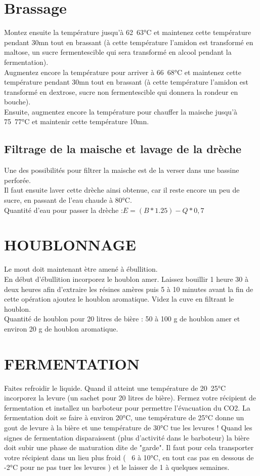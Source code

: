 \documentclass{report}
\begin{document}
\section{Brassage}
Montez ensuite la température jusqu'à 62~63°C et maintenez cette température pendant 30mn tout en brassant (à cette température l'amidon est transformé en maltose, un sucre fermentescible qui sera transformé en alcool pendant la fermentation).\\
Augmentez encore la température pour arriver à 66~68°C et maintenez cette température pendant 30mn tout en brassant (à cette température l'amidon est transformé en dextrose, sucre non fermentescible qui donnera la rondeur en bouche).\\
Ensuite, augmentez encore la température pour chauffer la maische jusqu'à 75~77°C et maintenir cette température 10mn.


\subsection*{ Filtrage de la maische et lavage de la drèche }

Une des possibilités pour filtrer la maische est de la verser dans une bassine perforée.\\
Il faut ensuite laver cette drèche ainsi obtenue, car il reste encore un peu de sucre, en passant de l'eau chaude à 80°C. \\
Quantité d'eau pour passer la drèche :$ E = (B * 1.25) - Q * 0,7$

\section{HOUBLONNAGE }

Le mout doit maintenant ètre amené à ébullition.\\
En début d'ébullition incorporez le houblon amer. Laissez bouillir 1 heure 30 à deux heures afin d'extraire les résines amères puis 5 à 10 minutes avant la fin de cette opération ajoutez le houblon aromatique. Videz la cuve en filtrant le houblon.\\

Quantité de houblon pour 20 litres de bière : 50 à 100 g de houblon amer et environ 20 g de houblon aromatique.

\section{FERMENTATION }

Faites refroidir le liquide. Quand il atteint une température de 20~25°C incorporez la levure (un sachet pour 20 litres de bière).
Fermez votre récipient de fermentation et installez un barboteur pour permettre l'évacuation du CO2.
La fermentation doit se faire à environ 20°C, une température de 25°C donne un gout de levure à la bière et une température de 30°C tue les levures !
Quand les signes de fermentation disparaissent (plus d'activité dans le barboteur) la bière doit subir une phase de maturation dite de "garde". Il faut pour cela transporter votre récipient dans un lieu plus froid (~ 6 à 10°C, en tout cas pas en dessous de -2°C pour ne pas tuer les levures ) et le laisser de 1 à quelques semaines.
\end{document}
